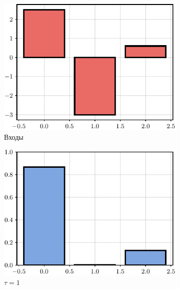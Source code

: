 \begin{figure}[t]
    \centering
    \begin{subfigure}[b]{0.24\textwidth}
    \includegraphics[width=\textwidth]{images/softmax_1.pdf}
    \caption{Входы}
    \end{subfigure}
    \hfill
    \begin{subfigure}[b]{0.24\textwidth}
    \includegraphics[width=1.0\textwidth]{images/softmax_2.pdf}
    \caption{$\tau=1$}
    \end{subfigure}
    \hfill
    \begin{subfigure}[b]{0.24\textwidth}

\end{subfigure}
\end{figure}
